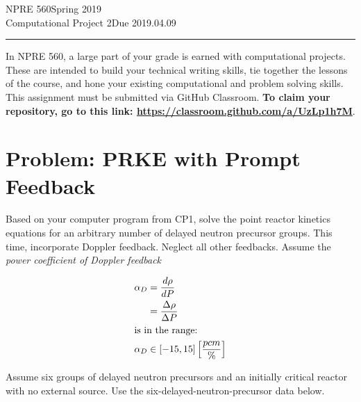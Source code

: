 \documentclass{article}
\newcommand{\class}{NPRE 560}
\newcommand{\term}{Spring 2019}
\newcommand{\assignment}{Computational Project 2}
\newcommand{\duedate}{2019.04.09}
\begin{document}
 


\class \hfill \term \\
\assignment \hfill Due \duedate\\
\rule[1ex]{\textwidth}{.1pt}


In \class, a large part of your grade is earned with computational projects. 
These are intended to build your technical writing skills, tie together the 
lessons of the course, and hone your existing computational and problem solving 
skills. This assignment must be submitted via GitHub Classroom. \textbf{To claim your 
repository, go to this link: \url{https://classroom.github.com/a/UzLp1h7M}}.

\section{Problem: PRKE with Prompt Feedback}

Based on your computer program from CP1, solve the point reactor kinetics equations for an 
arbitrary number of delayed neutron precursor groups. This time, incorporate Doppler 
feedback. Neglect all other feedbacks. Assume the \emph{power coefficient of 
Doppler feedback}

\begin{align*}
        \alpha_D &= \frac{d \rho}{d P}\\
                 &= \frac{\Delta \rho}{\Delta P}\\
\intertext{is in the range:}
        \alpha_D &\in \left[-15, 15\right]\left[\frac{pcm}{\%}\right]\\
\end{align*}


Assume six groups of delayed neutron precursors and an initially critical reactor with no external source. 
Use the six-delayed-neutron-precursor data below.
\end{document}
